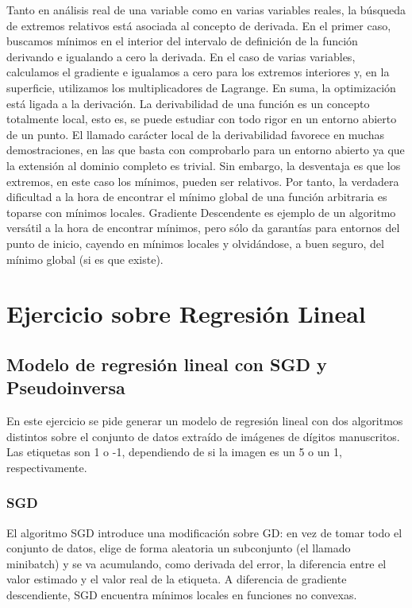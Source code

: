 Tanto en análisis real de una variable como en varias variables reales, la búsqueda de extremos relativos está asociada al concepto de derivada. En el primer caso, buscamos mínimos en el interior del intervalo de definición de la función derivando e igualando a cero la derivada. En el caso de varias variables, calculamos el gradiente e igualamos a cero para los extremos interiores y, en la superficie, utilizamos los multiplicadores de Lagrange. En suma, la optimización está ligada a la derivación. La derivabilidad de una función es un concepto totalmente local, esto es, se puede estudiar con todo rigor en un entorno abierto de un punto. El llamado carácter local de la derivabilidad favorece en muchas demostraciones, en las que basta con comprobarlo para un entorno abierto ya que la extensión al dominio completo es trivial. Sin embargo, la desventaja es que los extremos, en este caso los mínimos, pueden ser relativos. Por tanto, la verdadera dificultad a la hora de encontrar el mínimo global de una función arbitraria es toparse con mínimos locales. Gradiente Descendente es ejemplo de un algoritmo versátil a la hora de encontrar mínimos, pero sólo da garantías para entornos del punto de inicio, cayendo en mínimos locales y olvidándose, a buen seguro, del mínimo global (si es que existe).

\section{Ejercicio sobre Regresión Lineal}

\subsection{Modelo de regresión lineal con SGD y Pseudoinversa}

En este ejercicio se pide generar un modelo de regresión lineal con dos algoritmos distintos sobre el conjunto de datos extraído de imágenes de dígitos manuscritos. Las etiquetas son 1 o -1, dependiendo de si la imagen es un 5 o un 1, respectivamente.

\subsubsection{SGD}

El algoritmo SGD introduce una modificación sobre GD: en vez de tomar todo el conjunto de datos, elige de forma aleatoria un subconjunto (el llamado minibatch) y se va acumulando, como derivada del error, la diferencia entre el valor estimado y el valor real de la etiqueta. A diferencia de gradiente descendiente, SGD encuentra mínimos locales en funciones no convexas. \\

